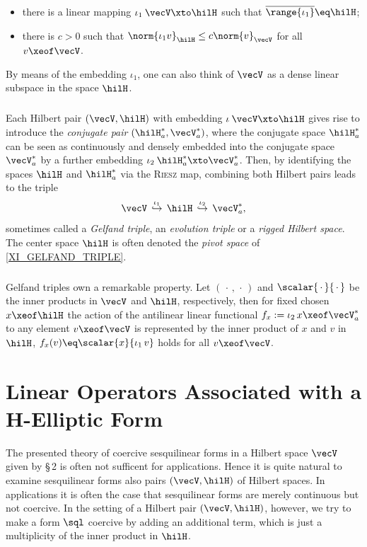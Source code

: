 \documentclass[11pt,twoside]{article}
\begin{document}
\begin{itemize}[leftmargin=15mm]
\item[(T-1)]
there is a linear mapping $\iota_1\:\vecV \xto \hilH$
such that $\overline{\range{\iota_1} }  \eq \hilH$;

\item[(T-2)]
there is $c>0$ such that
$\norm{\iota_1 v}_{\hilH} \leq c \norm{v}_{\vecV}$ for all $v \xeof \vecV$.
\end{itemize}

By means of the embedding $\iota_1$,
one can also think of $\vecV$ as a dense linear subspace in the space $\hilH$.

\subparagraph{} %
Each Hilbert pair $(\vecV,\hilH)$ with embedding $\iota\:\vecV \xto \hilH$
gives rise to introduce the \textit{conjugate pair} $(\hilH_a^*,\vecV_a^*)$,
where the conjugate space $\hilH_a^*$
can be seen as continuously and densely embedded
into the conjugate space $\vecV_a^*$
by a further embedding $\iota_2\:\hilH_a^* \xto \vecV_a^*$.
Then,
by identifying the spaces $\hilH$ and $\hilH_a^*$ via the \textsc{Riesz} map,
combining both Hilbert pairs leads to the triple
\begin{equation}\label{XI_GELFAND_TRIPLE}
\vecV \, \overset{\iota_1}{\hookrightarrow} \,
\hilH \, \overset{\iota_2}{\hookrightarrow} \, \vecV_a^*,
\end{equation}
sometimes called a \textit{Gelfand triple},
an \textit{evolution triple} or a \textit{rigged Hilbert space}.
The center space $\hilH$ is often denoted
the \textit{pivot space} of \eqref{XI_GELFAND_TRIPLE}.

\subparagraph{} %
Gelfand triples own a remarkable property.
Let $(\,\cdot\,,\,\cdot\,)$ and $\scalar{\,\cdot\,}{\,\cdot\,}$
be the inner products in $\vecV$ and $\hilH$,
respectively,
then for fixed chosen $x \xeof \hilH$
the action of the antilinear linear functional
$f_x := \iota_2 \, x \xeof \vecV_a^*$ to any element $v \xeof \vecV$
is represented by the inner product of $x$ and $v$ in $\hilH$,
{\ie} $f_x(v) \eq \scalar{x}{\iota_1 \, v}$ holds for all $v \xeof \vecV$.

\section{Linear Operators Associated with a H-Elliptic Form}
The presented theory of coercive sesquilinear forms in a Hilbert space $\vecV$
given by \S\,2 is often not sufficent for applications.
Hence it is quite natural to examine sesquilinear forms
also {\wrt} pairs $(\vecV,\hilH)$ of Hilbert spaces.
In applications it is often the case
that sesquilinear forms are merely continuous but not coercive.
In the setting of a Hilbert pair $(\vecV,\hilH)$,
however,
we try to make a form $\sql$ coercive
by adding an additional term,
which is just a multiplicity of the inner product in $\hilH$.
\end{document}
